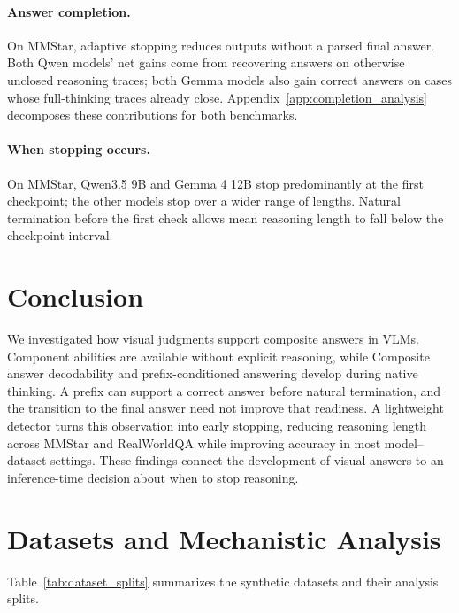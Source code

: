 \documentclass{article} %
\begin{document}
\paragraph{Answer completion.}
On MMStar, adaptive stopping reduces outputs without a parsed final answer. Both Qwen models' net gains come from recovering answers on otherwise unclosed reasoning traces; both Gemma models also gain correct answers on cases whose full-thinking traces already close. Appendix~\ref{app:completion_analysis} decomposes these contributions for both benchmarks.

\paragraph{When stopping occurs.}
On MMStar, Qwen3.5 9B and Gemma 4 12B stop predominantly at the first checkpoint; the other models stop over a wider range of lengths. Natural termination before the first check allows mean reasoning length to fall below the checkpoint interval.

\section{Conclusion}\label{sec:conclusion}

We investigated how visual judgments support composite answers in VLMs. Component abilities are available without explicit reasoning, while Composite answer decodability and prefix-conditioned answering develop during native thinking. A prefix can support a correct answer before natural termination, and the transition to the final answer need not improve that readiness. A lightweight detector turns this observation into early stopping, reducing reasoning length across MMStar and RealWorldQA while improving accuracy in most model--dataset settings. These findings connect the development of visual answers to an inference-time decision about when to stop reasoning.




\appendix
\section{Datasets and Mechanistic Analysis}
\label{app:data_generation}

Table~\ref{tab:dataset_splits} summarizes the synthetic datasets and their analysis splits.
\end{document}
